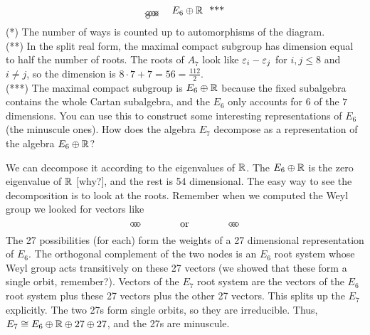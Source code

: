 \begin{example}
\[\begin{tabular}{clcl}
\begin{xy}
         p+(1,0) *\cir<2pt>{} **@{-};
              p+(0,-1) *\cir<2pt>{} **@{-},
         p+(1,0) *\cir<2pt>{} **@{-};
         p+(1,0) *\cir<2pt>{} **@{-};
         p+(1,0) *{\times} *\cir<2pt>{} **@{-};
       \end{xy} & $E_6\oplus \RR$ \ ***\\
   \end{tabular}
   \]
   (*) The number of ways is counted up to automorphisms of the diagram.\\
   (**) In the split real form, the maximal compact subgroup has dimension equal to
        half the number of roots. The roots of $A_7$ look like $\varepsilon_i-\varepsilon_j$ for $i,j\le
        8$ and $i\neq j$, so the dimension is $8\cdot 7 + 7 = 56 = \frac{112}{2}$.\\
%
%
%
%
%
%
%
   (***) The maximal compact subgroup is $E_6\oplus \mathbb{R}$ because the fixed subalgebra
   contains the whole Cartan subalgebra, and the $E_6$ only accounts for $6$ of the $7$
   dimensions. You can use this to construct some interesting representations of $E_6$
   (the minuscule ones). How does the algebra $E_7$ decompose as a representation of
   the algebra $E_6\oplus \mathbb{R}$?

   We can decompose it according to the eigenvalues of $\mathbb{R}$. The $E_6\oplus \mathbb{R}$ is
   the zero eigenvalue of $\mathbb{R}$ [why?], and the rest is 54 dimensional. The easy way to see
   the decomposition is to look at the roots. Remember when we computed the Weyl group
   we looked for vectors like
   \[\begin{xy}
     (0,0) *\cir<2pt>{}; (1,0) *\cir<2pt>{} **@{-}; (2,0) *\cir<2pt>{} **@{.}
   \end{xy} \qquad\qquad \text{or} \qquad\qquad
   \begin{xy}
     (0,0) *\cir<2pt>{}; (1,0) *\cir<2pt>{} **@{.}; (2,0) *\cir<2pt>{} **@{-}
   \end{xy}\]
   The 27 possibilities (for each) form the weights of a 27 dimensional representation
   of $E_6$. The orthogonal complement of the two nodes is an $E_6$ root system whose
   Weyl group acts transitively on these 27 vectors (we showed that these form a
   single orbit, remember?). Vectors of the $E_7$ root system are the vectors of the
   $E_6$ root system plus these 27 vectors plus the other 27 vectors. This splits up the
   $E_7$ explicitly. The two 27s form single orbits, so they are irreducible. Thus,
   $E_7\cong E_6\oplus \mathbb{R}\oplus 27\oplus 27$, and the 27s are minuscule.
 \end{example}
